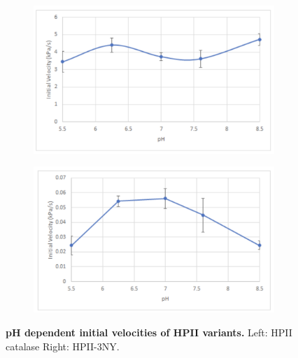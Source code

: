 \documentclass[9pt,twocolumn,twoside]{pnas-new}
\begin{document}
\begin{figure}[h!]
  \centering
  \begin{subfigure}{0.49\textwidth}
    \begin{minipage}{0.1\textwidth}\caption{}\end{minipage}%
    \begin{minipage}{0.9\textwidth}\includegraphics[width=0.9\linewidth]{figures/wildtype-velocity.png}\end{minipage}
  \end{subfigure}
  \begin{subfigure}{0.49\textwidth}
    \begin{minipage}{0.1\textwidth}\caption{}\end{minipage}%
    \begin{minipage}{0.9\textwidth}\includegraphics[width=0.9\linewidth]{figures/3ny-velocity.png}\end{minipage}
  \end{subfigure}
  \caption{\textbf{pH dependent initial velocities of HPII variants.} Left: HPII catalase Right: HPII-3NY.}
\label{fig:ph-dependent-velocities}
\end{figure}
\end{document}
